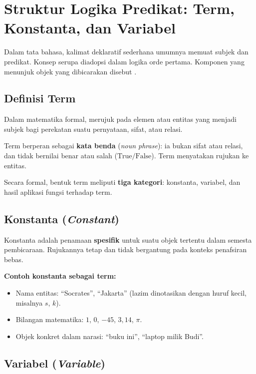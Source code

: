 \section{Struktur Logika Predikat: Term, Konstanta, dan Variabel}

Dalam tata bahasa, kalimat deklaratif sederhana umumnya memuat subjek dan predikat. Konsep serupa diadopsi dalam logika orde pertama. Komponen yang menunjuk objek yang dibicarakan disebut  \cite{rosen2019}.

\subsection{Definisi Term}

\begin{definisi}[Term]
Dalam matematika formal,  merujuk pada elemen atau entitas yang menjadi subjek bagi perekatan suatu pernyataan, sifat, atau relasi.
\end{definisi}

Term berperan sebagai \textbf{kata benda} (\textit{noun phrase}): ia bukan sifat atau relasi, dan tidak bernilai benar atau salah ($\text{True}/\text{False}$). Term menyatakan rujukan ke entitas.

Secara formal, bentuk term meliputi \textbf{tiga kategori}: konstanta, variabel, dan hasil aplikasi fungsi terhadap term.

\subsection{Konstanta (\textit{Constant})}

Konstanta adalah penamaan \textbf{spesifik} untuk suatu objek tertentu dalam semesta pembicaraan. Rujukannya tetap dan tidak bergantung pada konteks penafsiran bebas.

\begin{contoh}
\textbf{Contoh konstanta sebagai term:}
\begin{itemize}
    \item Nama entitas: ``Socrates'', ``Jakarta'' (lazim dinotasikan dengan huruf kecil, misalnya $s$, $k$).
    \item Bilangan matematika: $1$, $0$, $-45$, $3{,}14$, $\pi$.
    \item Objek konkret dalam narasi: ``buku ini'', ``laptop milik Budi''.
\end{itemize}
\end{contoh}

\subsection{Variabel (\textit{Variable})}

